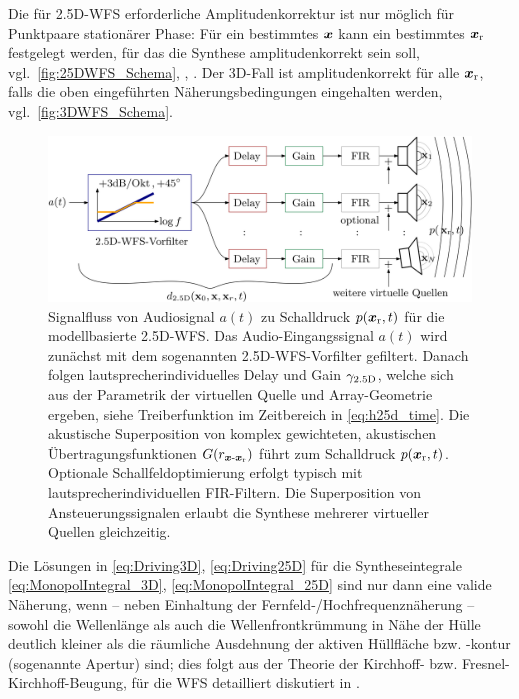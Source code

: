 Die für 2.5D-WFS erforderliche Amplitudenkorrektur ist nur möglich für Punktpaare
stationärer Phase: Für ein bestimmtes $\bm{x}$ kann ein bestimmtes $\bm{x}_\mathrm{r}$
festgelegt werden, für das die Synthese amplitudenkorrekt
sein soll, vgl.~\Abb\ref{fig:25DWFS_Schema}, \cite[Kap.~3]{Start1997_diss}, \cite[Kap.~4]{Firtha2019_diss}.
%
%
Der 3D-Fall ist amplitudenkorrekt für alle $\bm{x}_\mathrm{r}$, falls die oben eingeführten
Näherungsbedingungen eingehalten werden, vgl.~\Abb\ref{fig:3DWFS_Schema}.
%
\begin{figure}[t]
\centering
\begin{plotfigures}
\includegraphics[width=145mm]{../graphics_DEU/WFS_Blockdiagramm.png}
\end{plotfigures}
\caption{Signalfluss von Audiosignal $a(t)$ zu Schalldruck $p(\bm{x}_\mathrm{r}, t)$
für die modellbasierte 2.5D-WFS.
Das Audio-Eingangssignal $a(t)$ wird zunächst mit dem sogenannten 2.5D-WFS-Vorfilter
 gefiltert.
Danach folgen lautsprecherindividuelles Delay und Gain $\gamma_\text{2.5D}$, welche sich aus der
Parametrik der virtuellen Quelle und Array-Geometrie ergeben,
siehe Treiberfunktion im Zeitbereich
in \Glg\eqref{eq:h25d_time}.
Die akustische Superposition von komplex gewichteten, akustischen Übertragungsfunktionen
$G(r_{\bm{x}\text{-}\bm{x}_\mathrm{r}})$ führt zum Schalldruck $p(\bm{x}_\mathrm{r}, t)$.
Optionale Schallfeldoptimierung erfolgt typisch mit
lautsprecherindividuellen FIR-Filtern.
%
Die Superposition von Ansteuerungssignalen erlaubt die Synthese mehrerer virtueller
Quellen gleichzeitig.
%
\cc
}
\label{fig:WFS_Blockdiagramm}
\end{figure}


Die Lösungen in \Glg\eqref{eq:Driving3D}, \eqref{eq:Driving25D}
für die Syntheseintegrale
\eqref{eq:MonopolIntegral_3D}, \eqref{eq:MonopolIntegral_25D}
sind nur dann eine valide Näherung, wenn -- neben Einhaltung
der Fernfeld-/Hochfrequenznäherung --
sowohl die Wellenlänge als auch die Wellenfrontkrümmung in Nähe der Hülle
deutlich kleiner als die räumliche Ausdehnung der aktiven Hüllfläche bzw. -kontur
(sogenannte Apertur) sind;
dies folgt aus der Theorie der Kirchhoff- bzw.
Fresnel-Kirchhoff-Beugung, für die WFS detailliert diskutiert in
\cite{Schultz2016_diss, Firtha2019_diss}.



